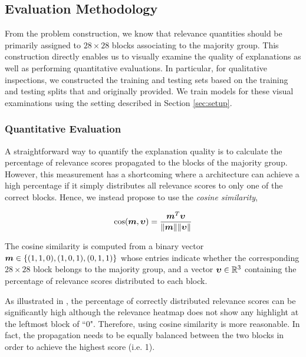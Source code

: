 \subsection{Evaluation Methodology}
\label{sec:evaluation_med}
From the problem construction, we know that relevance quantities should  be primarily assigned to $28\times28$ blocks associating to the majority group. This construction directly enables us to visually examine the quality of explanations as well as performing quantitative evaluations.  In particular, for qualitative inspections, we constructed the training and testing sets based on the training and testing splits that \citet{LeCunMNISThandwrittendigit2010} and \citet{XiaoFashionMNISTNovelImage2017} originally provided. We train models for these visual examinations using the setting described in Section \ref{sec:setup}. 

\subsubsection{Quantitative Evaluation}
A straightforward way to quantify the explanation quality is to calculate the percentage of relevance scores propagated to the blocks of the majority group. However, this measurement has a shortcoming where a architecture can achieve a high percentage if it simply distributes all relevance scores to only one of the correct blocks. Hence, we instead propose to use the \textit{cosine similarity},


\begin{align*}
\cos (\patvector{m}, \patvector{\upsilon}) = \frac{ \patvector{m}^T \patvector{\upsilon}}{ \| \patvector{m}  \| \|\patvector{\upsilon}   \|}	
\end{align*}

The cosine similarity is computed from  a  binary  vector $\patvector{m} \in \{(1,1,0), (1,0,1), (0, 1, 1) \} $  whose entries indicate whether the corresponding $28\times28$ block belongs to the majority group, and a vector $\patvector{\upsilon} \in \mathbb{R}^3$ containing the percentage of  relevance scores distributed to each block. 


As illustrated in \addfigure{\ref{fig:quantitative_evaluation}}, the percentage of correctly distributed relevance scores can be significantly high although the relevance heatmap does not show any highlight at the leftmost block of ``0". Therefore, using cosine similarity is more reasonable. In fact, the propagation needs to be equally balanced between the two blocks in order to achieve the highest score (i.e. 1). 

